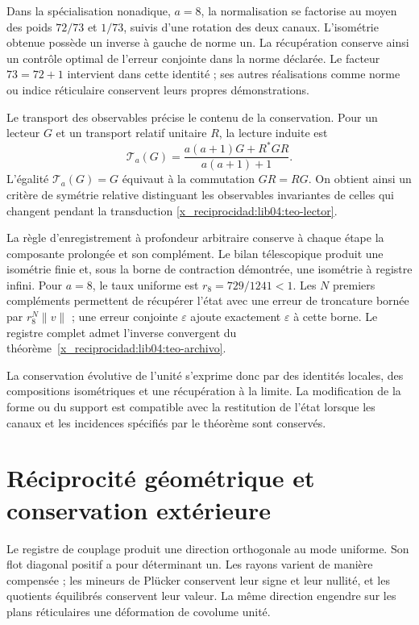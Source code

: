 Dans la spécialisation nonadique, \(a=8\), la normalisation se factorise au moyen des poids \(72/73\) et \(1/73\), suivis d’une rotation des deux canaux. L’isométrie obtenue possède un inverse à gauche de norme un. La récupération conserve ainsi un contrôle optimal de l’erreur conjointe dans la norme déclarée. Le facteur \(73=72+1\) intervient dans cette identité ; ses autres réalisations comme norme ou indice réticulaire conservent leurs propres démonstrations.

Le transport des observables précise le contenu de la conservation. Pour un lecteur \(G\) et un transport relatif unitaire \(R\), la lecture induite est
\[
 \mathcal T_a(G)=
 \frac{a(a+1)G+R^*GR}{a(a+1)+1}.
\]
L’égalité \(\mathcal T_a(G)=G\) équivaut à la commutation \(GR=RG\). On obtient ainsi un critère de symétrie relative distinguant les observables invariantes de celles qui changent pendant la transduction \ref{x_reciprocidad:lib04:teo-lector}.

La règle d’enregistrement à profondeur arbitraire conserve à chaque étape la composante prolongée et son complément. Le bilan télescopique produit une isométrie finie et, sous la borne de contraction démontrée, une isométrie à registre infini. Pour \(a=8\), le taux uniforme est \(r_8=729/1241<1\). Les \(N\) premiers compléments permettent de récupérer l’état avec une erreur de troncature bornée par \(r_8^N\|v\|\) ; une erreur conjointe \(\varepsilon\) ajoute exactement \(\varepsilon\) à cette borne. Le registre complet admet l’inverse convergent du théorème~\ref{x_reciprocidad:lib04:teo-archivo}.

La conservation évolutive de l’unité s’exprime donc par des identités locales, des compositions isométriques et une récupération à la limite. La modification de la forme ou du support est compatible avec la restitution de l’état lorsque les canaux et les incidences spécifiés par le théorème sont conservés.

\section{Réciprocité géométrique et conservation extérieure}

Le registre de couplage produit une direction orthogonale au mode uniforme. Son flot diagonal positif a pour déterminant un. Les rayons varient de manière compensée ; les mineurs de Plücker conservent leur signe et leur nullité, et les quotients équilibrés conservent leur valeur. La même direction engendre sur les plans réticulaires une déformation de covolume unité.

